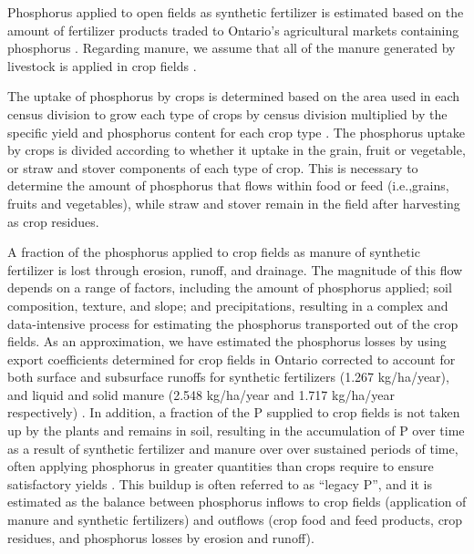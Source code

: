 \documentclass[authoryear]{elsarticle}
\begin{document}
Phosphorus applied to open fields as synthetic fertilizer is estimated based on the amount of fertilizer products traded to Ontario’s agricultural markets containing phosphorus \citep{FertilizerShipments}. 
Regarding manure, we assume that all of the manure generated by livestock is applied in crop fields \citep{IROWC_PHandbook}.

The uptake of phosphorus by crops is determined based on the area used in each census division \citep{CensusDivisionOpendatasoft} to grow each type of crops by census division \citep{FieldCropsCensus,FieldVegetablesCensus,GreenhousesCensus} multiplied by the specific yield and phosphorus content for each crop type \citep{USDAHandbook}.  The phosphorus uptake by crops is divided according to whether it uptake in the grain, fruit or vegetable, or straw and stover components of each type of crop. This is necessary to determine the amount of phosphorus that flows within food or feed (i.e.,grains, fruits and vegetables), while straw and stover remain in the field after harvesting as crop residues.

A fraction of the phosphorus applied to crop fields as manure of synthetic fertilizer is lost through erosion, runoff, and drainage. The magnitude of this flow depends on a range of factors, including the amount of phosphorus applied; soil composition, texture, and slope; and precipitations, resulting in a complex and data-intensive process for estimating the phosphorus transported out of the crop fields. As an approximation, we have estimated the phosphorus losses by using export coefficients determined for crop fields in Ontario corrected to account for both surface and subsurface runoffs for synthetic fertilizers (1.267 kg/ha/year), and liquid and solid manure (2.548 kg/ha/year and 1.717 kg/ha/year respectively) \citep{zhang2015tile, wang2018solid,tan2011surface}. In addition, a fraction of the P supplied to crop fields is not taken up by the plants and remains in soil, resulting in the accumulation of P over time as a result of synthetic fertilizer and manure over over sustained periods of time, often applying phosphorus in greater quantities than crops require to ensure satisfactory yields \citep{reid2019addressing}. This buildup is often referred to as “legacy P”, and it is estimated as the balance between phosphorus inflows to crop fields (application of manure and synthetic fertilizers) and outflows (crop food and feed products, crop residues, and phosphorus losses by erosion and runoff).
\end{document}
